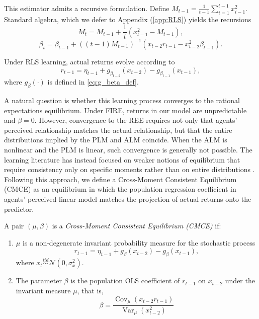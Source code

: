 \documentclass[11pt]{article}
\begin{document}
This estimator admits a recursive formulation. Define $M_{t-1} = \frac{1}{t-1} \sum^{t-1}_{i=1} x_{i-1}^2$. Standard algebra, which we defer to Appendix (\ref{app:RLS}) yields the recursions
\begin{equation}
    M_t = M_{t-1} + \frac{1}{t} \left(x_{t-1}^2 - M_{t-1} \right),
\end{equation}
\begin{equation}
    \beta_t = \beta_{t-1} + \left((t-1) M_{t-1} \right)^{-1} \left( x_{t-2} r_{t-1} - x_{t-2}^2 \beta_{t-1} \right).
\end{equation}

Under RLS learning, actual returns evolve according to
\begin{equation}\label{eq:alm_RLS}
    r_{t-1} = \eta_{t-1}
    + g_{\beta_{t-2}}(x_{t-2}) - g_{\beta_{t-1}}(x_{t-1}),
\end{equation}
where $g_\beta(\cdot)$ is defined in \eqref{eq:g_beta_def}.

A natural question is whether this learning process converges to the rational expectations equilibrium. 
Under FIRE, returns in our model are unpredictable and $\beta = 0$. 
However, convergence to the REE requires not only that agents' perceived relationship matches the actual relationship, but that the entire distributions implied by the PLM and ALM coincide. 
When the ALM is nonlinear and the PLM is linear, such convergence is generally not possible. 
The learning literature has instead focused on weaker notions of equilibrium that require consistency only on specific moments rather than on entire distributions \citep{Hommes2014}. 
Following this approach, we define a Cross-Moment Consistent Equilibrium (CMCE) as an equilibrium in which the population regression coefficient in agents' perceived linear model matches the projection of actual returns onto the predictor.


\begin{definition}\label{def:cmce}
A pair $(\mu,\beta)$ is a \emph{Cross-Moment Consistent Equilibrium (CMCE)} if:
\begin{enumerate}
    \item $\mu$ is a non-degenerate invariant probability measure for the 
    stochastic process
    \[
        r_{t-1}
        = \eta_{t-1}
        + g_{\beta}(x_{t-2})
        - g_{\beta}(x_{t-1}),
    \]
    where $x_t \stackrel{iid}{\sim} \mathcal{N}(0, \sigma^2_x)$.
    
    \item The parameter $\beta$ is the population OLS coefficient of $r_{t-1}$ 
    on $x_{t-2}$ under the invariant measure $\mu$, that is,
    \[
        \beta = \frac{\operatorname{Cov}_\mu(x_{t-2} r_{t-1})}{\operatorname{Var}_\mu(x_{t-2}^2)} 
    \]
\end{enumerate}
\end{definition}
\end{document}
